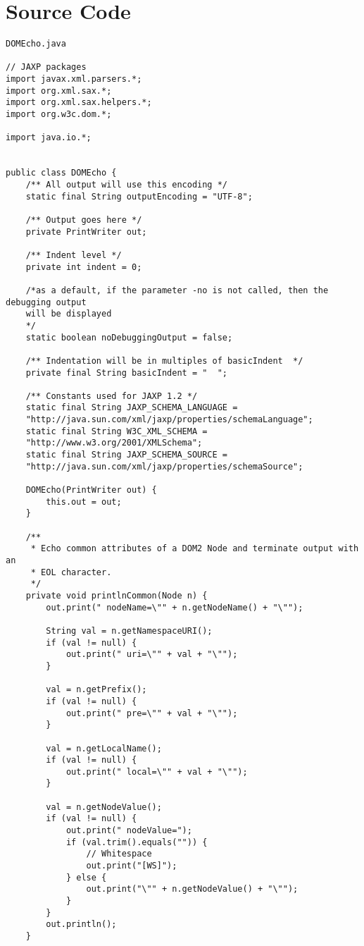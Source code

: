 \documentclass[11pt,english]{article}
\begin{document}
\section{Source Code}

\begin{lstlisting}
DOMEcho.java

// JAXP packages
import javax.xml.parsers.*;
import org.xml.sax.*;
import org.xml.sax.helpers.*;
import org.w3c.dom.*;

import java.io.*;


public class DOMEcho {
    /** All output will use this encoding */
    static final String outputEncoding = "UTF-8";

    /** Output goes here */
    private PrintWriter out;

    /** Indent level */
    private int indent = 0;

    /*as a default, if the parameter -no is not called, then the debugging output
    will be displayed
    */
    static boolean noDebuggingOutput = false; 

    /** Indentation will be in multiples of basicIndent  */
    private final String basicIndent = "  ";

    /** Constants used for JAXP 1.2 */
    static final String JAXP_SCHEMA_LANGUAGE =
    "http://java.sun.com/xml/jaxp/properties/schemaLanguage";
    static final String W3C_XML_SCHEMA =
    "http://www.w3.org/2001/XMLSchema";
    static final String JAXP_SCHEMA_SOURCE =
    "http://java.sun.com/xml/jaxp/properties/schemaSource";

    DOMEcho(PrintWriter out) {
        this.out = out;
    }

    /**
     * Echo common attributes of a DOM2 Node and terminate output with an
     * EOL character.
     */
    private void printlnCommon(Node n) {
        out.print(" nodeName=\"" + n.getNodeName() + "\"");

        String val = n.getNamespaceURI();
        if (val != null) {
            out.print(" uri=\"" + val + "\"");
        }

        val = n.getPrefix();
        if (val != null) {
            out.print(" pre=\"" + val + "\"");
        }

        val = n.getLocalName();
        if (val != null) {
            out.print(" local=\"" + val + "\"");
        }

        val = n.getNodeValue();
        if (val != null) {
            out.print(" nodeValue=");
            if (val.trim().equals("")) {
                // Whitespace
                out.print("[WS]");
            } else {
                out.print("\"" + n.getNodeValue() + "\"");
            }
        }
        out.println();
    }


\end{lstlisting}
\end{document}
